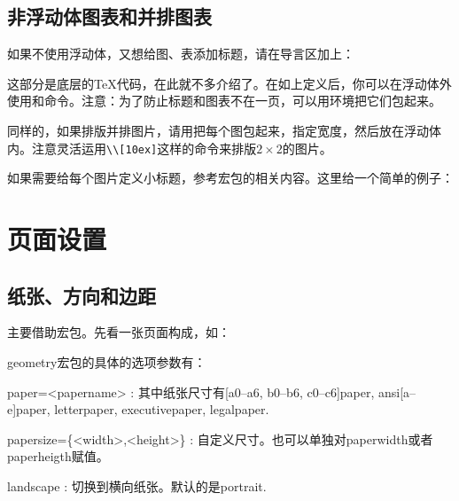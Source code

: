 \subsection{非浮动体图表和并排图表}
如果不使用浮动体，又想给图、表添加标题，请在导言区加上：
\begin{latex}
\makeatletter
\newcommand\figcaption{\def\@captype{figure}\caption}
\newcommand\tabcaption{\def\@captype{table}\caption}
\makeatother
\end{latex}

这部分是底层的\TeX 代码，在此就不多介绍了。在如上定义后，你可以在浮动体外使用和命令。注意：为了防止标题和图表不在一页，可以用环境把它们包起来。

同样的，如果排版并排图片，请用把每个图包起来，指定宽度，然后放在浮动体内。注意灵活运用\verb|\\[10ex]|这样的命令来排版$2\times 2$的图片。

如果需要给每个图片定义小标题，参考宏包的相关内容。这里给一个简单的例子：
\begin{latex}
\begin{figure}
\centering
\subfloat[...]{\label{sub-fig-1}
    \begin{minipage}
    \centering
    \texttt{[image: ...]}
    \end{minipage}}
\quad\subfloat[...]
\end{latex}

\section{页面设置}
\label{sec:geometry}
\subsection{纸张、方向和边距}
主要借助宏包。先看一张页面构成，如：
\begin{figure}
\centering

\label{fig:geo-paper}
\end{figure}

geometry宏包的具体的选项参数有：
\begin{para}
\item[paper=<papername>]: 其中纸张尺寸有[a0--a6, b0--b6, c0--c6]paper, ansi[a--e]paper, letterpaper, executivepaper, legalpaper.
\item[papersize=\{<width>,<height>\}]: 自定义尺寸。也可以单独对paperwidth或者paperheigth赋值。
\item[landscape]: 切换到横向纸张。默认的是portrait.
\end{para}

